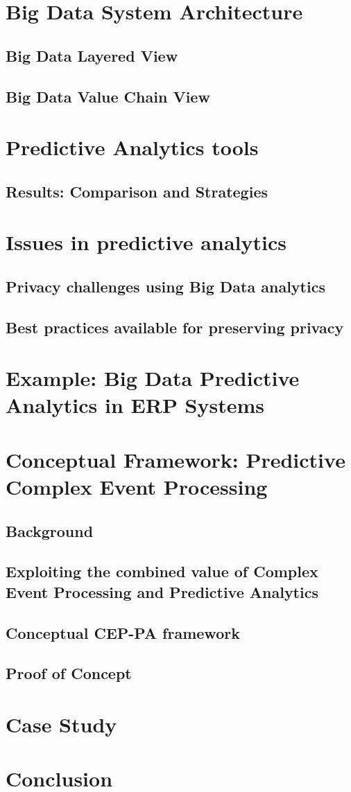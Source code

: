 \documentclass[runningheads]{llncs}
\begin{document}
\section{Big Data System Architecture}

\subsection{Big Data Layered View}
\subsection{Big Data Value Chain View}

\section{Predictive Analytics tools}
\subsection{Results: Comparison and Strategies}
\section{Issues in predictive analytics}
\subsection{Privacy challenges using Big Data analytics}
\subsection{Best practices available for preserving privacy}
\section{Example: Big Data Predictive Analytics in ERP Systems}
\section{Conceptual Framework: Predictive Complex Event Processing}
\subsection{Background}
\subsection{Exploiting the combined value of Complex Event Processing and Predictive Analytics}
\subsection{Conceptual CEP-PA framework}
\subsection{Proof of Concept}
\section{Case Study}

\section{Conclusion}


\end{document}
